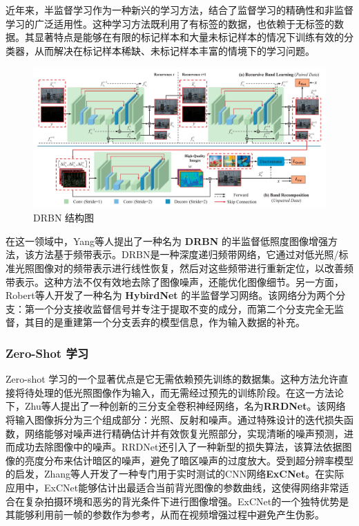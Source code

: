 \documentclass[a4paper, 10pt]{article}
\begin{document}
	近年来，半监督学习作为一种新兴的学习方法，结合了监督学习的精确性和非监督学习的广泛适用性。这种学习方法既利用了有标签的数据，也依赖于无标签的数据。其显著特点是能够在有限的标记样本和大量未标记样本的情况下训练有效的分类器，从而解决在标记样本稀缺、未标记样本丰富的情境下的学习问题。
	
	\begin{figure}[htb]
		\centering 
		\includegraphics[width=0.7\columnwidth]{picture/LLIE/DRBN/DRBN}
		\caption{
			\label{fig: DRBN} 
			DRBN 结构图
		}
	\end{figure}
	
	在这一领域中，Yang等人\cite{qiao2021deep}提出了一种名为 \textbf{DRBN} 的半监督低照度图像增强方法，该方法基于频带表示。DRBN是一种深度递归频带网络，它通过对低光照/标准光照图像对的频带表示进行线性恢复，然后对这些频带进行重新定位，以改善频带表示。这种方法不仅有效地去除了图像噪声，还能优化图像细节。另一方面，Robert等人开发了一种名为 \textbf{HybirdNet} 的半监督学习网络\cite{robert2018hybridnet}。该网络分为两个分支：第一个分支接收监督信号并专注于提取不变的成分，而第二个分支完全无监督，其目的是重建第一个分支丢弃的模型信息，作为输入数据的补充。
	
	\subsubsection{Zero-Shot 学习}
	
	Zero-shot 学习的一个显著优点是它无需依赖预先训练的数据集。这种方法允许直接将待处理的低光照图像作为输入，而无需经过预先的训练阶段。在这一方法论下，Zhu等人\cite{zhu2020zero}提出了一种创新的三分支全卷积神经网络，名为\textbf{RRDNet}。该网络将输入图像拆分为三个组成部分：光照、反射和噪声。通过特殊设计的迭代损失函数，网络能够对噪声进行精确估计并有效恢复光照部分，实现清晰的噪声预测，进而成功去除图像中的噪声。RRDNet还引入了一种新型的损失算法，该算法依据图像的亮度分布来估计暗区的噪声，避免了暗区噪声的过度放大。受到超分辨率模型的启发，Zhang等人\cite{zhang2019zero}开发了一种专门用于实时测试的CNN网络\textbf{ExCNet}。在实际应用中，ExCNet能够估计出最适合当前背光图像的参数曲线，这使得网络非常适合在复杂拍摄环境和恶劣的背光条件下进行图像增强。ExCNet的一个独特优势是其能够利用前一帧的参数作为参考，从而在视频增强过程中避免产生伪影。
	
\end{document}
